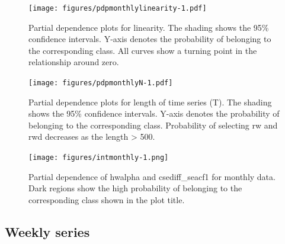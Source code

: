 \documentclass[11pt,a4paper,]{article}
\begin{document}
\begin{figure}
\centering
\texttt{[image: figures/pdpmonthlylinearity-1.pdf]}
\caption{\label{fig:pdpmonthlylinearity}Partial dependence plots for linearity. The shading shows the 95\% confidence intervals. Y-axis denotes the probability of belonging to the corresponding class. All curves show a turning point in the relationship around zero.}
\end{figure}

\begin{figure}
\centering
\texttt{[image: figures/pdpmonthlyN-1.pdf]}
\caption{\label{fig:pdpmonthlyN}Partial dependence plots for length of time series (T). The shading shows the 95\% confidence intervals. Y-axis denotes the probability of belonging to the corresponding class. Probability of selecting rw and rwd decreases as the length \textgreater{} 500.}
\end{figure}

\begin{figure}
\centering
\texttt{[image: figures/intmonthly-1.png]}
\caption{\label{fig:intmonthly}Partial dependence of hwalpha and csediff\_seacf1 for monthly data. Dark regions show the high probability of belonging to the corresponding class shown in the plot title.}
\end{figure}

\hypertarget{weekly-series}{%
\subsection{Weekly series}\label{weekly-series}}
\end{document}
